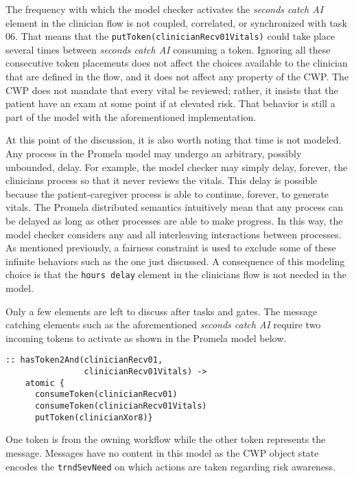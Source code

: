 The frequency with which the model checker activates the \emph{seconds catch AI} element in the clinician flow is not coupled, correlated, or synchronized with task 06.
That means that the \texttt{putToken(clinicianRecv01Vitals)} could take place several times between \emph{seconds catch AI} consuming a token.
Ignoring all these consecutive token placements does not affect the choices available to the clinician that are defined in the flow, and it does not affect any property of the CWP.
The CWP does not mandate that every vital be reviewed;
rather, it insists that the patient have an exam at some point if at elevated risk.
That behavior is still a part of the model with the aforementioned implementation.

At this point of the discussion, it is also worth noting that time is not modeled.
Any process in the Promela model may undergo an arbitrary, possibly unbounded, delay.
For example, the model checker may simply delay, forever, the clinicians process so that it never reviews the vitals.
This delay is possible because the patient-caregiver process is able to continue, forever, to generate vitals.
The Promela distributed semantics intuitively mean that any process can be delayed as long as other processes are able to make progress.
In this way, the model checker considers any and all interleaving interactions between processes.
As mentioned previously, a fairness constraint is used to exclude some of these infinite behaviors such as the one just discussed.
A consequence of this modeling choice is that the \texttt{hours delay} element in the clinicians flow is not needed in the model.

Only a few elements are left to discuss after tasks and gates.
The message catching elements such as the aforementioned \textit{seconds catch AI} require two incoming tokens to activate as shown in the Promela model below.
%
{\small
\begin{lstlisting}[style=myPromela]
:: hasToken2And(clinicianRecv01, 
                clinicianRecv01Vitals) -> 
    atomic {
      consumeToken(clinicianRecv01)
      consumeToken(clinicianRecv01Vitals)
      putToken(clinicianXor8)}
\end{lstlisting}
}
%
\noindent One token is from the owning workflow while the other token represents the message.
Messages have no content in this model as the CWP object state encodes the \texttt{trndSevNeed} on which actions are taken regarding risk awareness.

